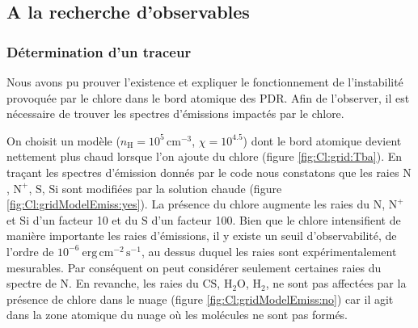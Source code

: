 
\subsection{A la recherche d'observables}
\subsubsection{Détermination d'un traceur}

Nous avons pu prouver l'existence et expliquer le fonctionnement de l'instabilité provoquée par le chlore dans le bord atomique des PDR. Afin de l'observer, il est nécessaire de trouver les spectres d'émissions impactés par le chlore. \newline 

On choisit un modèle ($n_\mathrm{H}=10^5 \, \mathrm{cm}^{-3}$, $\chi=10^{4.5}$) dont le bord atomique devient nettement plus chaud lorsque l'on ajoute du chlore (figure \ref{fig:Cl:grid:Tba}). En traçant les spectres d'émission donnés par le code nous constatons que les raies $\mathrm{N}$, $\mathrm{N}^+$, $\mathrm{S}$, $\mathrm{Si}$ sont modifiées par la solution chaude (figure \ref{fig:Cl:gridModelEmiss:yes}). La présence du chlore augmente les raies du $\mathrm{N}$, $\mathrm{N}^+$ et $\mathrm{Si}$ d'un facteur 10 et du $\mathrm{S}$ d'un facteur 100. Bien que le chlore intensifient de manière importante les raies d'émissions, il y existe un seuil d'observabilité, de l'ordre de $10^{-6} \ \mathrm{erg}\,\mathrm{cm}^{-2}\,\mathrm{s}^{-1}$, au dessus duquel les raies sont expérimentalement mesurables. Par conséquent on peut considérer seulement certaines raies du spectre de $\mathrm{N}$. En revanche, les raies du $\mathrm{CS}$, $\mathrm{H}_2\mathrm{O}$, $\mathrm{H}_2$, ne sont pas affectées par la présence de chlore dans le nuage (figure \ref{fig:Cl:gridModelEmiss:no}) car il agit dans la zone atomique du nuage où les molécules ne sont pas formés. \newline

